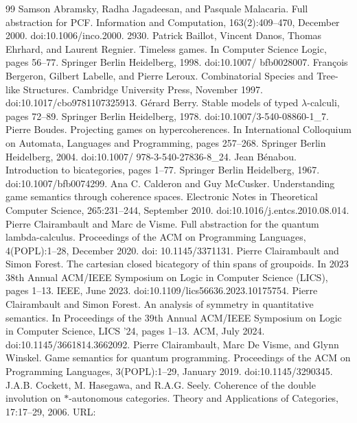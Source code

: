 \documentclass[10pt,a4paper]{article}
\begin{document}
\begin{thebibliography}{99}
 Samson Abramsky, Radha Jagadeesan, and Pasquale Malacaria. Full abstraction for PCF.
Information and Computation, 163(2):409–470, December 2000. doi:10.1006/inco.2000.
2930.
 Patrick Baillot, Vincent Danos, Thomas Ehrhard, and Laurent Regnier. Timeless games.
In Computer Science Logic, pages 56–77. Springer Berlin Heidelberg, 1998. doi:10.1007/
bfb0028007.
 François Bergeron, Gilbert Labelle, and Pierre Leroux. Combinatorial Species and Tree-like
Structures. Cambridge University Press, November 1997. doi:10.1017/cbo9781107325913.
 Gérard Berry. Stable models of typed \ensuremath{\lambda}-calculi, pages 72–89. Springer Berlin Heidelberg, 1978.
doi:10.1007/3-540-08860-1\_7.
 Pierre Boudes. Projecting games on hypercoherences. In International Colloquium on Automata,
Languages and Programming, pages 257–268. Springer Berlin Heidelberg, 2004. doi:10.1007/
978-3-540-27836-8\_24.
 Jean Bénabou. Introduction to bicategories, pages 1–77. Springer Berlin Heidelberg, 1967.
doi:10.1007/bfb0074299.
 Ana C. Calderon and Guy McCusker. Understanding game semantics through coherence
spaces. Electronic Notes in Theoretical Computer Science, 265:231–244, September 2010.
doi:10.1016/j.entcs.2010.08.014.
 Pierre Clairambault and Marc de Visme. Full abstraction for the quantum lambda-calculus.
Proceedings of the ACM on Programming Languages, 4(POPL):1–28, December 2020. doi:
10.1145/3371131.
 Pierre Clairambault and Simon Forest. The cartesian closed bicategory of thin spans of
groupoids. In 2023 38th Annual ACM/IEEE Symposium on Logic in Computer Science
(LICS), pages 1–13. IEEE, June 2023. doi:10.1109/lics56636.2023.10175754.
 Pierre Clairambault and Simon Forest. An analysis of symmetry in quantitative semantics. In
Proceedings of the 39th Annual ACM/IEEE Symposium on Logic in Computer Science, LICS
’24, pages 1–13. ACM, July 2024. doi:10.1145/3661814.3662092.
 Pierre Clairambault, Marc De Visme, and Glynn Winskel. Game semantics for quantum
programming. Proceedings of the ACM on Programming Languages, 3(POPL):1–29, January
2019. doi:10.1145/3290345.
 J.A.B. Cockett, M. Hasegawa, and R.A.G. Seely. Coherence of the double involution on
\ensuremath{*}-autonomous categories. Theory and Applications of Categories, 17:17–29, 2006. URL:

\end{thebibliography}
\end{document}
